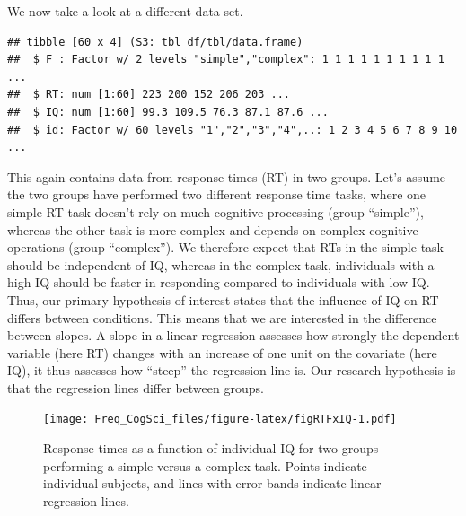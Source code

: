 \documentclass[
  12pt,
]{krantz}
\newenvironment{Shaded}{\begin{snugshade}}{\end{snugshade}}
\newcommand{\FunctionTok}[1]{\textcolor[rgb]{0.00,0.00,0.00}{#1}}
\newcommand{\NormalTok}[1]{#1}
\newcommand{\OtherTok}[1]{\textcolor[rgb]{0.56,0.35,0.01}{#1}}
\newcommand{\SpecialCharTok}[1]{\textcolor[rgb]{0.00,0.00,0.00}{#1}}
\newcommand{\StringTok}[1]{\textcolor[rgb]{0.31,0.60,0.02}{#1}}
\theoremstyle{definition}
\theoremstyle{definition}
\theoremstyle{definition}
\theoremstyle{definition}
\theoremstyle{remark}
\begin{document}
We now take a look at a different data set.

\begin{Shaded}
\end{Shaded}

\begin{verbatim}
## tibble [60 x 4] (S3: tbl_df/tbl/data.frame)
##  $ F : Factor w/ 2 levels "simple","complex": 1 1 1 1 1 1 1 1 1 1 ...
##  $ RT: num [1:60] 223 200 152 206 203 ...
##  $ IQ: num [1:60] 99.3 109.5 76.3 87.1 87.6 ...
##  $ id: Factor w/ 60 levels "1","2","3","4",..: 1 2 3 4 5 6 7 8 9 10 ...
\end{verbatim}

This again contains data from response times (RT) in two groups. Let's assume the two groups have performed two different response time tasks, where one simple RT task doesn't rely on much cognitive processing (group ``simple''), whereas the other task is more complex and depends on complex cognitive operations (group ``complex''). We therefore expect that RTs in the simple task should be independent of IQ, whereas in the complex task, individuals with a high IQ should be faster in responding compared to individuals with low IQ. Thus, our primary hypothesis of interest states that the influence of IQ on RT differs between conditions. This means that we are interested in the difference between slopes. A slope in a linear regression assesses how strongly the dependent variable (here RT) changes with an increase of one unit on the covariate (here IQ), it thus assesses how ``steep'' the regression line is. Our research hypothesis is that the regression lines differ between groups.

\begin{figure}
\centering
\texttt{[image: Freq\_CogSci\_files/figure-latex/figRTFxIQ-1.pdf]}
\caption{\label{fig:figRTFxIQ}Response times as a function of individual IQ for two groups performing a simple versus a complex task. Points indicate individual subjects, and lines with error bands indicate linear regression lines.}
\end{figure}
\end{document}
